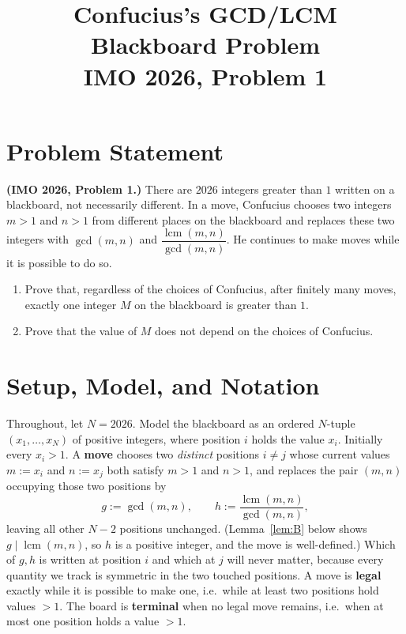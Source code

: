 \documentclass[11pt]{article}
\title{Confucius's GCD/LCM Blackboard Problem\\[2pt]\large IMO 2026, Problem 1}
\author{}
\date{}
\theoremstyle{plain}
\theoremstyle{definition}
\theoremstyle{remark}
\begin{document}
\maketitle

\section*{Problem Statement}

\noindent\textbf{(IMO 2026, Problem 1.)} There are $2026$ integers greater than
$1$ written on a blackboard, not necessarily different. In a move, Confucius
chooses two integers $m>1$ and $n>1$ from different places on the blackboard
and replaces these two integers with $\gcd(m,n)$ and
$\dfrac{\operatorname{lcm}(m,n)}{\gcd(m,n)}$. He continues to make moves while
it is possible to do so.
\begin{enumerate}[label=(\alph*)]
\item Prove that, regardless of the choices of Confucius, after finitely many
moves, exactly one integer $M$ on the blackboard is greater than $1$.
\item Prove that the value of $M$ does not depend on the choices of Confucius.
\end{enumerate}

\section{Setup, Model, and Notation}

Throughout, let $N = 2026$. Model the blackboard as an ordered $N$-tuple
$(x_1,\dots,x_N)$ of positive integers, where position $i$ holds the value
$x_i$. Initially every $x_i > 1$. A \textbf{move} chooses two \emph{distinct}
positions $i \ne j$ whose current values $m := x_i$ and $n := x_j$ both satisfy
$m>1$ and $n>1$, and replaces the pair $(m,n)$ occupying those two positions by
\[
g := \gcd(m,n), \qquad h := \frac{\operatorname{lcm}(m,n)}{\gcd(m,n)},
\]
leaving all other $N-2$ positions unchanged. (Lemma~\ref{lem:B} below shows
$g \mid \operatorname{lcm}(m,n)$, so $h$ is a positive integer, and the move is
well-defined.) Which of $g,h$ is written at position $i$ and which at $j$ will
never matter, because every quantity we track is symmetric in the two touched
positions. A move is \textbf{legal} exactly while it is possible to make one,
i.e.\ while at least two positions hold values $> 1$. The board is
\textbf{terminal} when no legal move remains, i.e.\ when at most one position
holds a value $> 1$.
\end{document}
